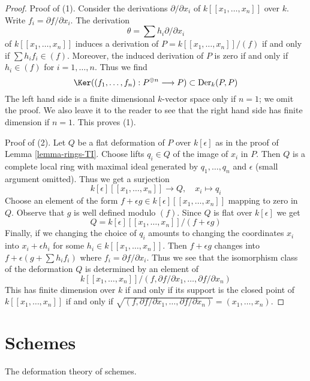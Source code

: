 \begin{proof}
Proof of (1). Consider the derivations $\partial/\partial x_i$ of
$k[[x_1, \ldots, x_n]]$ over $k$. Write $f_i = \partial f/\partial x_i$.
The derivation
$$
\theta = \sum h_i \partial/\partial x_i
$$
of $k[[x_1, \ldots, x_n]]$
induces a derivation of $P = k[[x_1, \ldots, x_n]]/(f)$
if and only if
$\sum h_i f_i \in (f)$. Moreover, the induced derivation of $P$
is zero if and only if $h_i \in (f)$ for $i = 1, \ldots, n$.
Thus we find
$$
\Ker((f_1, \ldots, f_n) : P^{\oplus n} \longrightarrow P) \subset
\text{Der}_k(P, P)
$$
The left hand side is a finite dimensional $k$-vector space only if
$n = 1$; we omit the proof. We also leave it to the reader to see
that the right hand side has finite dimension if $n = 1$.
This proves (1).

\medskip\noindent
Proof of (2). Let $Q$ be a flat deformation of $P$ over $k[\epsilon]$
as in the proof of Lemma \ref{lemma-rings-TI}. Choose lifts $q_i \in Q$
of the image of $x_i$ in $P$. Then $Q$ is a complete local ring
with maximal ideal generated by $q_1, \ldots, q_n$ and $\epsilon$
(small argument omitted). Thus we get a surjection
$$
k[\epsilon][[x_1, \ldots, x_n]] \longrightarrow Q,\quad
x_i \longmapsto q_i
$$
Choose an element of the form
$f + \epsilon g \in k[\epsilon][[x_1, \ldots, x_n]]$
mapping to zero in $Q$. Observe that $g$ is well defined modulo $(f)$.
Since $Q$ is flat over $k[\epsilon]$ we get
$$
Q = k[\epsilon][[x_1, \ldots, x_n]]/(f + \epsilon g)
$$
Finally, if we changing the choice of $q_i$ amounts to
changing the coordinates $x_i$ into $x_i + \epsilon h_i$
for some $h_i \in k[[x_1, \ldots, x_n]]$. Then
$f + \epsilon g$ changes into $f + \epsilon (g + \sum h_i f_i)$
where $f_i = \partial f/\partial x_i$. Thus we see that the
isomorphism class of the deformation $Q$ is determined
by an element of
$$
k[[x_1, \ldots, x_n]]/
(f, \partial f/\partial x_1, \ldots,  \partial f/\partial x_n)
$$
This has finite dimension over $k$ if and only if
its support is the closed point of $k[[x_1, \ldots, x_n]]$
if and only if
$\sqrt{(f, \partial f/\partial x_1, \ldots,  \partial f/\partial x_n)} =
(x_1, \ldots, x_n)$.
\end{proof}






\section{Schemes}
\label{section-schemes}

\noindent
The deformation theory of schemes.

